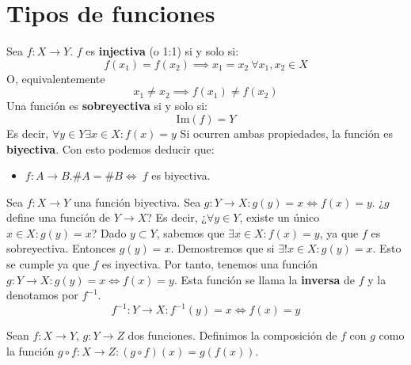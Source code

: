 \documentclass{../Topologia.tex}
\begin{document}
\section{Tipos de funciones}
Sea $f:X\to Y$. $f$ es \textbf{injectiva} (o 1:1) si y solo si:
$$
f(x_{1})=f(x_{2}) \implies x_{1}=x_{2}~ \forall x_{1},x_{2}\in X
$$
O, equivalentemente
$$
x_{1}\neq x_{2} \implies f(x_{1})\neq f(x_{2})
$$
Una función es \textbf{sobreyectiva} si y solo si:
$$
\mathrm{Im}(f)=Y
$$
Es decir, $\forall y \in Y \exists x \in X:f(x)=y$
Si ocurren ambas propiedades, la función es \textbf{biyectiva}.
Con esto podemos deducir que:
\begin{itemize}
    \item $f:A\to B. \#A=\#B \iff~f$ es biyectiva.
\end{itemize}
Sea $f:X\to Y$ una función biyectiva. Sea $g:Y\to X : g(y)=x \iff f(x)=y$.
¿$g$ define una función de $Y\to X$?
Es decir, ¿$\forall y \in Y$, existe un único $x \in X : g(y)=x$?
Dado $y \subset Y$, sabemos que $\exists x \in X : f(x)=y$, ya que $f$ es sobreyectiva. Entonces $g(y)=x$.
Demostremos que si $\exists ! x \in X :g(y)=x$. Esto se cumple ya que $f$ es inyectiva. Por tanto, tenemos una función $g:Y\to X : g(y)=x \iff f(x)=y$. Esta función se llama la \textbf{inversa} de $f$ y la denotamos por $f^{-1}$.
$$
f^{-1}:Y\to X: f^{-1}(y)=x\iff f(x)=y
$$

\begin{defin}
Sean $f:X\to Y$, $g:Y\to Z$ dos funciones. Definimos la composición de $f$ con $g$ como la función $g\circ f: X\to Z:(g\circ f)(x)=g(f(x))$.
\end{defin}
\end{document}
